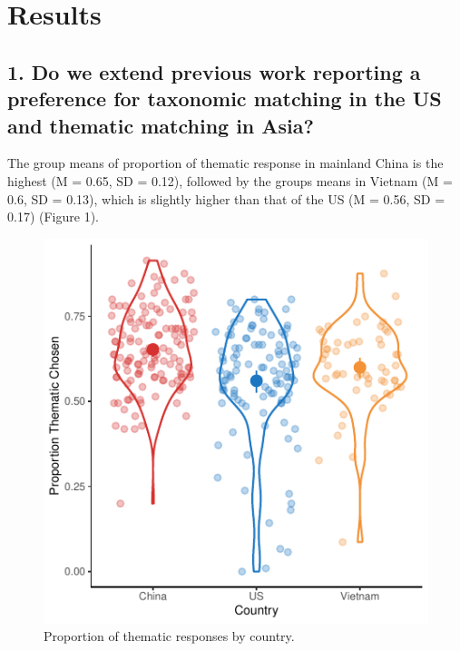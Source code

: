 \documentclass[10pt, letterpaper]{article}
\newenvironment{CodeChunk}{}{}
\begin{document}
\hypertarget{results}{%
\section{Results}\label{results}}

\hypertarget{do-we-extend-previous-work-reporting-a-preference-for-taxonomic-matching-in-the-us-and-thematic-matching-in-asia}{%
\subsection{1. Do we extend previous work reporting a preference for
taxonomic matching in the US and thematic matching in
Asia?}\label{do-we-extend-previous-work-reporting-a-preference-for-taxonomic-matching-in-the-us-and-thematic-matching-in-asia}}

The group means of proportion of thematic response in mainland China is
the highest (M = 0.65, SD = 0.12), followed by the groups means in
Vietnam (M = 0.6, SD = 0.13), which is slightly higher than that of the
US (M = 0.56, SD = 0.17) (Figure 1).

\begin{CodeChunk}
\begin{figure}[tb]

{\centering \includegraphics{figs/unnamed-chunk-1-1} 

}

\caption[Proportion of thematic responses by country]{Proportion of thematic responses by country.}\label{fig:unnamed-chunk-1}
\end{figure}
\end{CodeChunk}
\end{document}
